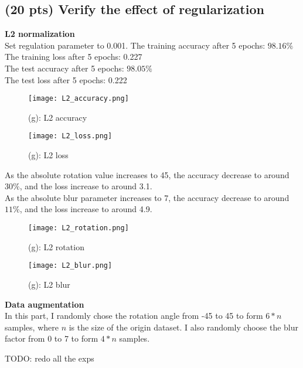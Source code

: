 \documentclass{article}
\begin{document}
\subsection{(20 pts) Verify the effect of regularization}
\textbf{L2 normalization}\\
Set regulation parameter to 0.001.
The training accuracy after 5 epochs: $98.16\%$\\
The training loss after 5 epochs: 0.227\\
The test accuracy after 5 epochs: $98.05\%$\\
The test loss after 5 epochs: 0.222\\

\begin{figure}[hbt]
	\begin{minipage}[b]{.5\textwidth}\centering
		\texttt{[image: L2\_accuracy.png]}
		\caption{(g): L2 accuracy}\label{L2_accuracy}
	\end{minipage}
	\begin{minipage}[b]{.5\textwidth}\centering
		\texttt{[image: L2\_loss.png]}
		\caption{(g): L2 loss}\label{L2_loss}
	\end{minipage}
\end{figure}
As the absolute rotation value increases to 45, the accuracy decrease to around $30\%$, and the loss increase to around 3.1.\\
As the absolute blur parameter increases to 7, the accuracy decrease to around $11\%$, and the loss increase to around 4.9.\\
\begin{figure}[hbt]
	\begin{minipage}[b]{.5\textwidth}\centering
		\texttt{[image: L2\_rotation.png]}
		\caption{(g): L2 rotation}\label{L2_rotation}
	\end{minipage}
	\begin{minipage}[b]{.5\textwidth}\centering
		\texttt{[image: L2\_blur.png]}
		\caption{(g): L2 blur}\label{L2_blur}
	\end{minipage}
\end{figure}

\textbf{Data augmentation}\\
In this part, I randomly chose the rotation angle from -45 to 45 to form $6*n$ samples, where $n$ is the size of the origin dataset. I also randomly choose the blur factor from 0 to 7 to form $4*n$ samples.

TODO: redo all the exps
\end{document}
